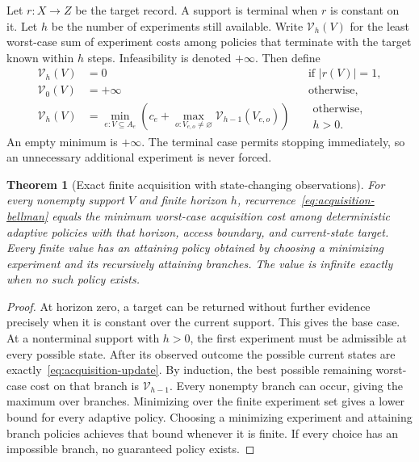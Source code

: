 \documentclass[11pt,letterpaper]{article}
\theoremstyle{plain}
\newtheorem{theorem}{Theorem}[section]
\theoremstyle{definition}
\begin{document}
Let $r:X\to Z$ be the target record. A support is terminal when $r$ is constant on it. Let $h$ be the number of experiments still available. Write $\mathcal V_h(V)$ for the least worst-case sum of experiment costs among policies that terminate with the target known within $h$ steps. Infeasibility is denoted $+\infty$. Then define
\begin{equation}\label{eq:acquisition-bellman}
\begin{aligned}
\mathcal V_h(V)&=0 &&\text{if }|r(V)|=1,\\
\mathcal V_0(V)&=+\infty &&\text{otherwise},\\
\mathcal V_h(V)&=\min_{e:V\subseteq A_e}
\left(c_e+\max_{o:V_{e,o}\ne\varnothing}\mathcal V_{h-1}(V_{e,o})\right)
&&\substack{\text{otherwise,}\\h>0.}
\end{aligned}
\end{equation}
An empty minimum is $+\infty$. The terminal case permits stopping immediately, so an unnecessary additional experiment is never forced.

\begin{theorem}[Exact finite acquisition with state-changing observations]\label{thm:acquisition}
For every nonempty support $V$ and finite horizon $h$, recurrence~\eqref{eq:acquisition-bellman} equals the minimum worst-case acquisition cost among deterministic adaptive policies with that horizon, access boundary, and current-state target. Every finite value has an attaining policy obtained by choosing a minimizing experiment and its recursively attaining branches. The value is infinite exactly when no such policy exists.
\end{theorem}
\begin{proof}
At horizon zero, a target can be returned without further evidence precisely when it is constant over the current support. This gives the base case. At a nonterminal support with $h>0$, the first experiment must be admissible at every possible state. After its observed outcome the possible current states are exactly~\eqref{eq:acquisition-update}. By induction, the best possible remaining worst-case cost on that branch is $\mathcal V_{h-1}$. Every nonempty branch can occur, giving the maximum over branches. Minimizing over the finite experiment set gives a lower bound for every adaptive policy. Choosing a minimizing experiment and attaining branch policies achieves that bound whenever it is finite. If every choice has an impossible branch, no guaranteed policy exists.
\end{proof}
\end{document}
